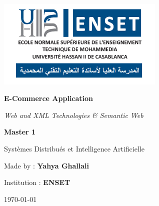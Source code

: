 \begin{titlepage}
    \centering
    \includegraphics[width=0.6\textwidth]{./logoEnset.png}\par
    \vspace*{1cm}

    {\Huge\bfseries E-Commerce Application \par}
    \vspace{0.5cm}
    {\large\itshape Web and XML Technologies \& Semantic Web \par}
    \vspace{2cm}

    {\Large\textbf{Master 1}\par}
    \vspace{0.5cm}
    {\large Systèmes Distribués et Intelligence Artificielle \par}
    \vspace{2cm}

    \vfill
    \begin{flushright}
        {\large Made by : \textbf{Yahya Ghallali}\par}
        {\large Institution : \textbf{ENSET}\par}
        {\normalsize \today\par}
    \end{flushright}

\end{titlepage}
